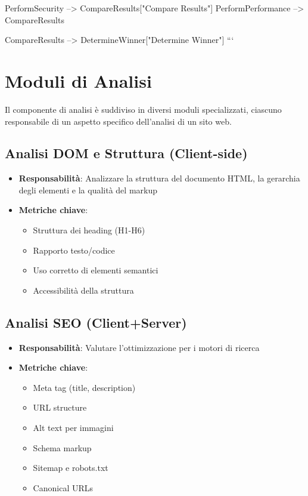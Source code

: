     PerformSecurity --> CompareResults["Compare Results"]
    PerformPerformance --> CompareResults
    
    CompareResults --> DetermineWinner["Determine Winner"]
```

\section{Moduli di Analisi}
Il componente di analisi è suddiviso in diversi moduli specializzati, ciascuno responsabile di un aspetto specifico dell'analisi di un sito web.

\subsection{Analisi DOM e Struttura (Client-side)}
\begin{itemize}
    \item \textbf{Responsabilità}: Analizzare la struttura del documento HTML, la gerarchia degli elementi e la qualità del markup
    \item \textbf{Metriche chiave}:
    \begin{itemize}
        \item Struttura dei heading (H1-H6)
        \item Rapporto testo/codice
        \item Uso corretto di elementi semantici
        \item Accessibilità della struttura
    \end{itemize}
\end{itemize}

\subsection{Analisi SEO (Client+Server)}
\begin{itemize}
    \item \textbf{Responsabilità}: Valutare l'ottimizzazione per i motori di ricerca
    \item \textbf{Metriche chiave}:
    \begin{itemize}
        \item Meta tag (title, description)
        \item URL structure
        \item Alt text per immagini
        \item Schema markup
        \item Sitemap e robots.txt
        \item Canonical URLs
    \end{itemize}
\end{itemize}

